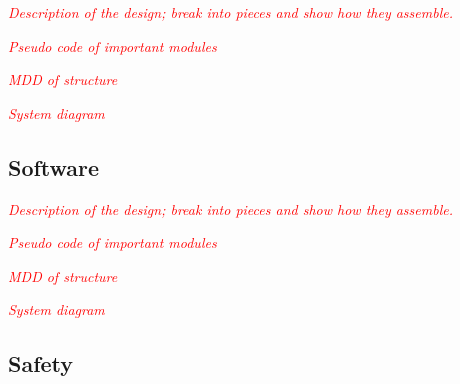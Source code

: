 \textit{\textcolor{red}{Description of the design; break into pieces and show how 
						they assemble.}}

\textit{\textcolor{red}{Pseudo code of important modules}}

\textit{\textcolor{red}{MDD of structure}}

\textit{\textcolor{red}{System diagram}}


\subsection{Software}
\textit{\textcolor{red}{Description of the design; break into pieces and show how 
						they assemble.}}

\textit{\textcolor{red}{Pseudo code of important modules}}

\textit{\textcolor{red}{MDD of structure}}

\textit{\textcolor{red}{System diagram}}

\subsection{Safety}
